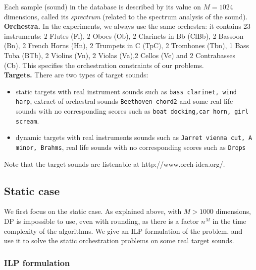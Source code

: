 \documentclass[a4paper]{book}
\begin{document}
Each sample (sound) in the database is described by its value on $M=1024$ dimensions, called its {\it sprectrum} (related to the spectrum analysis of the sound). \\

{\bf Orchestra.} In the experiments, we always use the same orchestra: it contains 23 instruments: 2 Flutes (Fl), 2 Oboes (Ob), 2 Clarinets in Bb (ClBb), 2 Bassoon (Bn), 2 French Horns (Hn), 2 Trumpets in C (TpC), 2 Trombones (Tbn), 1 Bass Tuba (BTb), 2 Violins (Vn), 2 Violas (Va),2 Cellos (Vc) and 2 Contrabasses (Cb). 
This specifies the orchestration constraints of our problems.\\


{\bf Targets.}
There are two types of target sounds: 
\begin{itemize}
    \item static targets with real instrument sounds such as \texttt{bass clarinet, wind harp}, extract of orchestral sounds \texttt{Beethoven chord2} and some real life sounds with no corresponding scores such as \texttt{boat docking,car horn, girl scream}.
    \item dynamic targets with real instruments sounds such as \texttt{Jarret vienna cut, A minor, Brahms}, real life sounds with no corresponding scores such as \texttt{Drops}
\end{itemize}

Note that the target sounds are listenable at http://www.orch-idea.org/.\\


		
						



\subsection{Static case}\label{sec:expstat}

We first focus on the static case. As explained above, with $M>1000$ dimensions, DP is impossible to use, even with rounding, as there is a factor $n^M$ in the time complexity of the algorithms. We give an ILP formulation of the problem, and use it to solve the static orchestration problems on some real target sounds.

\subsubsection{ILP formulation}
\end{document}
